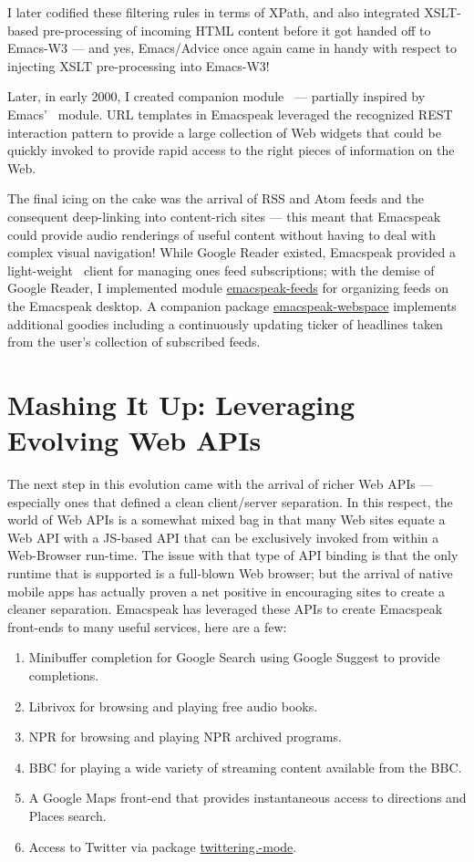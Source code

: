 \documentclass[11pt]{article}
\begin{document}
I later codified these filtering rules in terms of XPath, and
also integrated XSLT-based pre-processing of incoming HTML
content before it got handed off to Emacs-W3 — and yes,
Emacs/Advice once again came in handy with respect to injecting
XSLT pre-processing into Emacs-W3!

Later, in early 2000, I created companion module
$_{\text{ }}$— partially inspired by Emacs'
$_{\text{ }}$module.
URL templates in Emacspeak leveraged the  recognized REST
interaction pattern to provide a large collection of Web widgets
that could be quickly invoked to provide rapid access to the
right pieces of information on the Web.

The final icing on the cake was the arrival of RSS and Atom feeds
and the consequent deep-linking into content-rich sites — this
meant that Emacspeak could provide audio renderings of useful
content without having to deal with complex visual navigation!
While Google Reader existed, Emacspeak provided a light-weight
$_{\text{ }}$client for managing ones feed subscriptions; with the
demise of Google Reader, I implemented module \uline{emacspeak-feeds}
for organizing feeds on the Emacspeak desktop. A companion
package \uline{emacspeak-webspace} implements additional goodies
including a continuously updating ticker of headlines taken from
the user's collection of subscribed feeds.


\section{Mashing It Up: Leveraging Evolving Web APIs}
\label{sec-15}

The next step in this evolution came with the arrival of richer
Web APIs — especially ones that defined a clean client/server
separation. In this respect, the world of Web APIs is a somewhat
mixed bag in that many Web sites equate a Web API  with a
JS-based API that can be exclusively invoked from within a Web-Browser
run-time. 
The issue with that type of API  binding is that the only runtime
that is supported is a full-blown Web browser; but the arrival of
native mobile apps  has actually proven a net positive in
encouraging sites to create a cleaner separation. Emacspeak has
leveraged these APIs to create Emacspeak front-ends 
to many useful services, here are a few:

\begin{enumerate}
\item Minibuffer completion for Google Search using Google Suggest
to provide completions.
\item Librivox for browsing  and playing free audio books.
\item NPR  for browsing and playing NPR archived programs.
\item BBC for playing a wide variety of streaming content
available from the BBC.
\item A Google Maps front-end that  provides instantaneous access
to directions and Places search.
\item Access to Twitter via package \uline{twittering.-mode}.
\end{enumerate}
\end{document}
